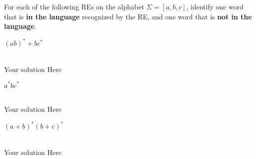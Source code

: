 \documentclass[12pt]{article}
\newenvironment{exercise}[2][Exercise]{\begin{trivlist}
\item[\hskip \labelsep {\bfseries #1}\hskip \labelsep {\bfseries #2.}]}{\end{trivlist}}
\newenvironment{solution}[1][{\color{red} Solution:}]{\begin{trivlist}
\item[\hskip \labelsep {\bfseries #1}\hskip \labelsep {\bfseries}]}{\end{trivlist}}
\begin{document}
 
\begin{exercise}{1}
For each of the following REs on the alphabet $\Sigma = [a,b,c]$, identify one word that is \textbf{in the language} recognized by the RE, and one word that is \textbf{not in the language}.
\begin{enumerate}[(a)]
\item $(ab)^*+bc^*$
\begin{solution} 
\quad\\
Your solution Here
\end{solution}

\item $a^*bc^*$
\begin{solution}
\quad\\
Your solution Here
\end{solution}

\item $(a+b)^*(b+c)^*$
\begin{solution}
\quad\\
Your solution Here 
\end{solution}

\end{enumerate}
\end{exercise}

\clearpage
\end{document}
